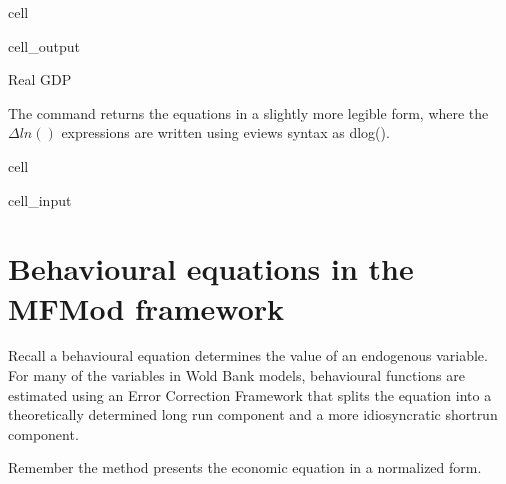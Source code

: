 \documentclass[letterpaper,10pt,english]{jupyterBook}
\begin{document}
\begin{sphinxuseclass}{cell}
\begin{sphinxVerbatimOutput}
\begin{sphinxuseclass}{cell_output}
\begin{sphinxVerbatim}[commandchars=\\\{\}]
\PYGZsq{}Real GDP\PYGZsq{}
\end{sphinxVerbatim}

\end{sphinxuseclass}\end{sphinxVerbatimOutput}

\end{sphinxuseclass}
\sphinxAtStartPar
The  command returns the equations in a slightly more legible form, where the \(\Delta ln()\) expressions are written using eviews syntax as dlog().

\begin{sphinxuseclass}{cell}\begin{sphinxVerbatimInput}

\begin{sphinxuseclass}{cell_input}
\begin{sphinxVerbatim}[commandchars=\\\{\}]
\end{sphinxVerbatim}

\end{sphinxuseclass}\end{sphinxVerbatimInput}

\end{sphinxuseclass}

\section{Behavioural equations in the MFMod framework}
\label{\detokenize{content/06_WBModels/LoadingWBModel:behavioural-equations-in-the-mfmod-framework}}
\sphinxAtStartPar
Recall a behavioural equation determines the value of an endogenous variable. For many of the variables in Wold Bank models, behavioural functions are estimated using an Error Correction Framework that splits the equation into a theoretically determined long run component and a more idiosyncratic short\sphinxhyphen{}run component.

\sphinxAtStartPar
Remember the  method presents the economic equation in a normalized form.
\end{document}
